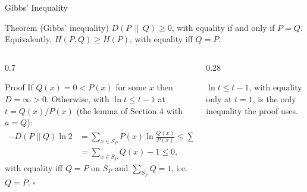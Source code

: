 \begin{frame}{Gibbs' Inequality}
  \small
  \begin{block}{Theorem (Gibbs' inequality)}
    $D(P\,\|\,Q)\ge0$, with equality if and only if $P=Q$. Equivalently, $H(P,Q)\ge H(P)$, with equality iff $Q=P$.
  \end{block}
  \begin{columns}[T]
    \begin{column}{0.7\textwidth}
      \begin{block}{Proof}
        If $Q(x)=0<P(x)$ for some $x$ then $D=\infty>0$. Otherwise, with $\ln t\le t-1$ at $t=Q(x)/P(x)$ (the lemma of Section 4 with $a=Q$):
        \begin{align*}
          -D(P\|Q)\ln2&=\sum_{x\in S_P}P(x)\ln\frac{Q(x)}{P(x)}\le\sum_{x\in S_P}P(x)\Big(\frac{Q(x)}{P(x)}-1\Big)\\
          &=\sum_{x\in S_P}Q(x)-1\le0,
        \end{align*}
        with equality iff $Q=P$ on $S_P$ and $\sum_{S_P}Q=1$, i.e.\ $Q=P$. \hfill$\square$
      \end{block}
    \end{column}
    \begin{column}{0.28\textwidth}
      \centering
      \par\smallskip
      {\footnotesize $\ln t\le t-1$, with equality only at $t=1$, is the only inequality the proof uses.}
    \end{column}
  \end{columns}
\end{frame}


